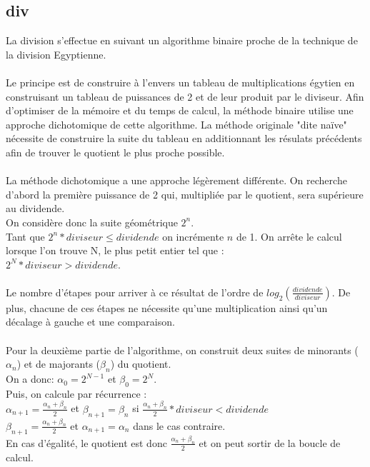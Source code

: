 \documentclass{article}
\begin{document}
\subsection{div}
La division s'effectue en suivant un algorithme binaire proche de la technique de la division Egyptienne.
\\
\\
Le principe est de construire à l'envers un tableau de multiplications égytien en construisant un tableau de puissances de 2 et de leur produit par le diviseur.
Afin d'optimiser de la mémoire et du temps de calcul, la méthode binaire utilise une approche dichotomique de cette algorithme.
La méthode originale "dite naïve" nécessite de construire la suite du tableau en additionnant les résulats précédents afin de trouver le quotient le plus
proche possible.
\\
\\
La méthode dichotomique a une approche légèrement différente.
On recherche d'abord la première puissance de 2 qui, multipliée par le quotient, sera supérieure au dividende.
\\
On considère donc la suite géométrique $2^{n}$.
\\
Tant que $2^{n} * diviseur \leq dividende$ on incrémente $n$ de 1.
On arrête le calcul lorsque l'on trouve N, le plus petit entier tel que :
\\
$2^{N} * diviseur > dividende$.
\\
\\
Le nombre d'étapes pour arriver à ce résultat de l'ordre de $log_{2}(\frac{dividende}{diviseur})$.
De plus, chacune de ces étapes ne nécessite qu'une multiplication ainsi qu'un décalage à gauche et une comparaison.
\\
\\
Pour la deuxième partie de l'algorithme, on construit deux suites de minorants ($\alpha_{n}$) et de majorants ($\beta_{n}$) du quotient.
\\
On a donc: $\alpha_{0} = 2^{N-1}$ et $\beta_{0} = 2^{N}$.
\\
Puis, on calcule par récurrence :
\\
$\alpha_{n+1} = \frac{\alpha_{n} + \beta_{n}}{2}$ et $\beta_{n+1} = \beta_{n}$ si $\frac{\alpha_{n} + \beta_{n}}{2} * diviseur < dividende$
\\
$\beta_{n+1} = \frac{\alpha_{n} + \beta_{n}}{2}$ et $\alpha_{n+1} = \alpha_{n}$ dans le cas contraire.
\\
En cas d'égalité, le quotient est donc $\frac{\alpha_{n} + \beta_{n}}{2}$ et on peut sortir de la boucle de calcul.
\end{document}
